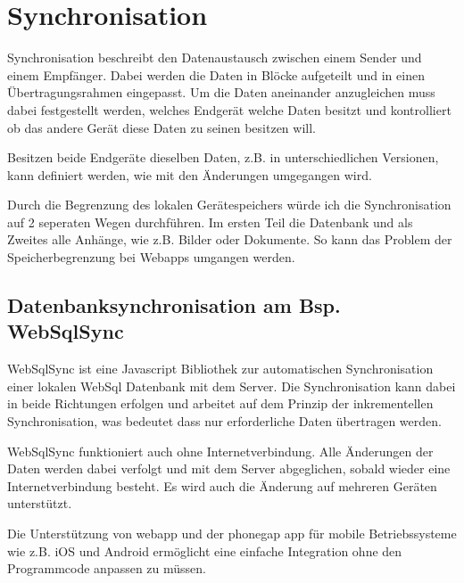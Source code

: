 %
\chapter{Synchronisation}
\label{sec:Synchronisation}


Synchronisation beschreibt den Datenaustausch zwischen einem Sender und einem Empfänger. Dabei werden die Daten in Blöcke aufgeteilt und in einen Übertragungsrahmen eingepasst. Um die Daten aneinander anzugleichen muss dabei festgestellt werden, welches Endgerät welche Daten besitzt und kontrolliert ob das andere Gerät diese Daten zu seinen besitzen will.

Besitzen beide Endgeräte dieselben Daten, z.B. in unterschiedlichen Versionen, kann definiert werden, wie mit den Änderungen umgegangen wird.\cite[]{WEB:SYNCML:2014}

Durch die Begrenzung des lokalen Gerätespeichers würde ich die Synchronisation auf 2 seperaten Wegen durchführen. Im ersten Teil die Datenbank und als Zweites alle Anhänge, wie z.B. Bilder oder Dokumente. So kann das Problem der Speicherbegrenzung bei Webapps umgangen werden.

\section{Datenbanksynchronisation am Bsp. WebSqlSync}
\label{sec:dbsync}

WebSqlSync ist eine Javascript Bibliothek zur automatischen Synchronisation einer lokalen WebSql Datenbank mit dem Server. Die Synchronisation kann dabei in beide Richtungen erfolgen und arbeitet auf dem Prinzip der inkrementellen Synchronisation, was bedeutet dass nur erforderliche Daten übertragen werden.

WebSqlSync funktioniert auch ohne Internetverbindung. Alle Änderungen der Daten werden dabei verfolgt und mit dem Server abgeglichen, sobald wieder eine Internetverbindung besteht. Es wird auch die Änderung auf mehreren Geräten unterstützt.

Die Unterstützung von webapp und der phonegap app für mobile Betriebssysteme wie z.B. iOS und Android ermöglicht eine einfache Integration ohne den Programmcode anpassen zu müssen.\cite[]{WEB:WEBSQLSYNC:2014}

